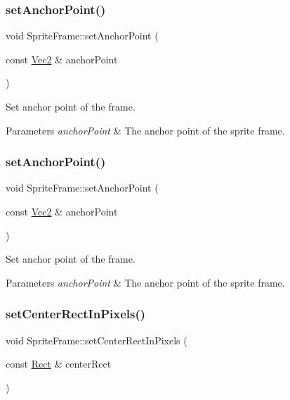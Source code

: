 \subsubsection{\texorpdfstring{set\+Anchor\+Point()}{setAnchorPoint()}\hspace{0.1cm}{\footnotesize\ttfamily [1/2]}}
{\footnotesize\ttfamily void Sprite\+Frame\+::set\+Anchor\+Point (\begin{DoxyParamCaption}\item[{const \hyperlink{classVec2}{Vec2} \&}]{anchor\+Point }\end{DoxyParamCaption})}

Set anchor point of the frame.


\begin{DoxyParams}{Parameters}
{\em anchor\+Point} & The anchor point of the sprite frame. \\
\hline
\end{DoxyParams}
\mbox{\label{classSpriteFrame_a04d7b2e3d26984c6d47f82937cb226d1}} 
\subsubsection{\texorpdfstring{set\+Anchor\+Point()}{setAnchorPoint()}\hspace{0.1cm}{\footnotesize\ttfamily [2/2]}}
{\footnotesize\ttfamily void Sprite\+Frame\+::set\+Anchor\+Point (\begin{DoxyParamCaption}\item[{const \hyperlink{classVec2}{Vec2} \&}]{anchor\+Point }\end{DoxyParamCaption})}

Set anchor point of the frame.


\begin{DoxyParams}{Parameters}
{\em anchor\+Point} & The anchor point of the sprite frame. \\
\hline
\end{DoxyParams}
\mbox{\label{classSpriteFrame_a5f99a427f7b85cdd513ac79d9ae27784}} 
\subsubsection{\texorpdfstring{set\+Center\+Rect\+In\+Pixels()}{setCenterRectInPixels()}}
{\footnotesize\ttfamily void Sprite\+Frame\+::set\+Center\+Rect\+In\+Pixels (\begin{DoxyParamCaption}\item[{const \hyperlink{classRect}{Rect} \&}]{center\+Rect }\end{DoxyParamCaption})}

